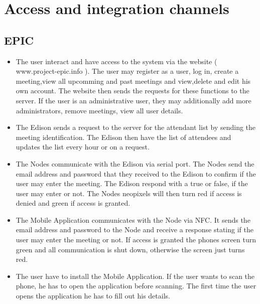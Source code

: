 \documentclass[a4paper,12pt,titlepage]{article}
\begin{document}

\newpage	\section{Access and integration channels}
\subsection{EPIC}
	\begin{itemize}
		\item The user interact and have access to the system via the website ( www.project-epic.info ). The user may register as a user, log in, create a meeting,view all upcomming and past meetings and view,delete and edit his own account. The website then sends the requests for these functions to the server. If the user is an administrative user, they may additionally add more administrators, remove meetings, view all user details.
\item The Edison sends a request to the server for the attendant list by sending the meeting identification. The Edison then have the list of attendees and updates the list every hour or on a request.
\item The Nodes communicate with the Edison via serial port. The Nodes send the email address and password that they received to the Edison to confirm if the user may enter the meeting. The Edison respond with a true or false, if the user may enter or not. The Nodes neopixels will then turn red if access is denied and green if access is granted.
\item The Mobile Application communicates with the Node via NFC. It sends the email address and password to the Node and receive a response stating if the user may enter the meeting or not. If access is granted the phones screen turn green and all communication is shut down, otherwise the screen just turns red.
\item The  user have to install the Mobile Application. If the user wants to scan the phone, he has to open the application before scanning. The first time the user opens the application he has to fill out his details. 

	\end{itemize}
\end{document}
